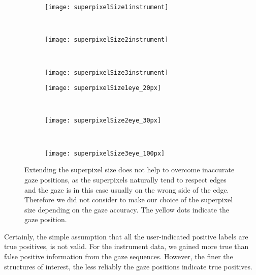 \begin{figure}[ht]
	\centering
	\begin{subfigure}[h]{0.31\textwidth}
	      \texttt{[image: superpixelSize1instrument]}
	\end{subfigure}
	~
	\begin{subfigure}[h]{0.31\textwidth}
		\texttt{[image: superpixelSize2instrument]}	
	\end{subfigure}
	~
	\begin{subfigure}[h]{0.31\textwidth}
		\texttt{[image: superpixelSize3instrument]}	
	\end{subfigure}	
	
	\vspace{3mm}
	\begin{subfigure}[h]{0.31\textwidth}
	      \texttt{[image: superpixelSize1eye\_20px]}
	\end{subfigure}
	~
	\begin{subfigure}[h]{0.31\textwidth}
		\texttt{[image: superpixelSize2eye\_30px]}	
	\end{subfigure}
	~
	\begin{subfigure}[h]{0.31\textwidth}
		\texttt{[image: superpixelSize3eye\_100px]}	
	\end{subfigure}	
	\caption{Extending the superpixel size does not help to overcome inaccurate gaze positions, as the superpixels naturally tend to respect edges and the gaze is in this case usually on the wrong side of the edge. Therefore we did not consider to make our choice of the superpixel size depending on the gaze accuracy. The yellow dots indicate the gaze position.}
	\label{fig:gazeOffSuperpixelSize}
\end{figure}

Certainly, the simple assumption that all the user-indicated positive labels are true positives, is not valid. 
For the instrument data, we gained more true than false positive information from the gaze sequences. 
However, the finer the structures of interest, the less reliably the gaze positions indicate true positives.
